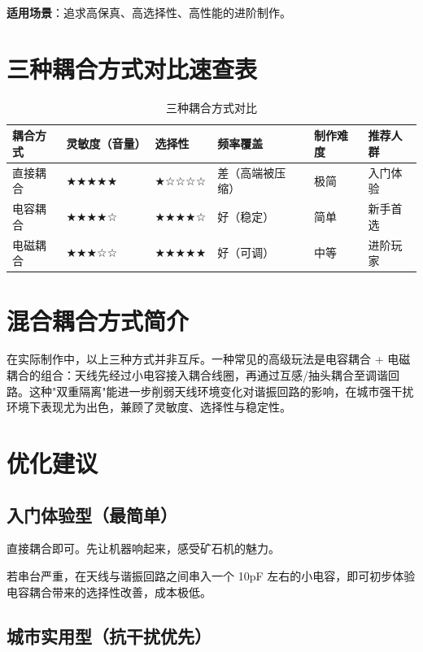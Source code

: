 \documentclass[12pt,UTF8]{ctexbook}
\begin{document}
\textbf{适用场景}：追求高保真、高选择性、高性能的进阶制作。

\section{三种耦合方式对比速查表}

\begin{table}[H]
	\centering
	\begin{tabular}{|l|l|l|l|l|l|}
		\hline
		耦合方式 & 灵敏度（音量） & 选择性 & 频率覆盖 & 制作难度 & 推荐人群 \\
		\hline
		直接耦合 & ★★★★★ & ★☆☆☆☆ & 差（高端被压缩） & 极简 & 入门体验 \\
		\hline
		电容耦合 & ★★★★☆ & ★★★★☆ & 好（稳定） & 简单 & 新手首选 \\
		\hline
		电磁耦合 & ★★★☆☆ & ★★★★★ & 好（可调） & 中等 & 进阶玩家 \\
		\hline
	\end{tabular}
	\caption{三种耦合方式对比}
	\label{tab:coupling-comparison}
\end{table}

\section{混合耦合方式简介}

在实际制作中，以上三种方式并非互斥。一种常见的高级玩法是电容耦合 + 电磁耦合的组合：天线先经过小电容接入耦合线圈，再通过互感/抽头耦合至调谐回路。这种"双重隔离"能进一步削弱天线环境变化对谐振回路的影响，在城市强干扰环境下表现尤为出色，兼顾了灵敏度、选择性与稳定性。

\section{优化建议}

\subsection{入门体验型（最简单）}

直接耦合即可。先让机器响起来，感受矿石机的魅力。

若串台严重，在天线与谐振回路之间串入一个 10pF 左右的小电容，即可初步体验电容耦合带来的选择性改善，成本极低。

\subsection{城市实用型（抗干扰优先）}
\end{document}
